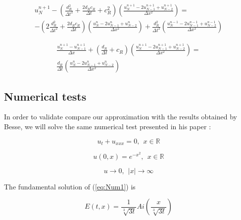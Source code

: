\begin{equation}
	\begin{aligned}
    u_N^{n+1} - \left( \frac{d_R^2}{\Delta t^2} + \frac{2d_Rc_R}{\Delta t} + c_R^2  \right) \left(  \frac{u_{N}^{n+1} - 2u_{N-1}^{n+1} + u_{N-2}^{n+1}}{\Delta x^2} \right) =\\
     -\left( 2\frac{d_R^2}{\Delta t^2} + \frac{2d_Rc_R}{\Delta t}\right) \left(  \frac{u_N^{n} - 2u_{N-1}^n + u_{N-2}^{n}}{\Delta x^2} \right) + \frac{d_R^2}{\Delta t^2} \left(  \frac{u_N^{n-1} - 2u_{N-1}^{n-1} + u_{N-2}^{n-1}}{\Delta x^2} \right)
    \end{aligned}
\end{equation} 
   
\begin{equation}
	\begin{aligned}	
    \frac{u_N^{n+1} - u_{N-1}^{n+1}}{\Delta x} + \left( \frac{d_R}{\Delta t} + c_R \right) \left( \frac{u_N^{n+1} -2 u_{N-1}^{n+1} + u_{N-2}^{n+1}}{\Delta x^2}\right) = \\
      \frac{d_R}{\Delta t}\left( \frac{u_{N}^{n} - 2u_{N-1}^{n} + u_{N-2}^n}{\Delta x^2}\right)
    \end{aligned}
\end{equation}


\subsection{Numerical tests}

\indent In order to validate compare our approximation with the results obtained by Besse, we will solve the same numerical test presented in his paper : 

\begin{equation}
\label{eq:Num1}
 u_t + u_{xxx} = 0, \ \ x \in \mathbb{R}
\end{equation}

\begin{equation}
\label{eq:Num2}
 u(0,x) = e^{-x^2}, \ \ x \in \mathbb{R} 
\end{equation}

\begin{equation}
\label{eq:Num3}
 u \rightarrow 0, \ \ |x| \rightarrow \infty
\end{equation}

\indent The fundamental solution of (\ref{eq:Num1}) is

\begin{equation}
    E(t,x) = \frac{1}{\sqrt[3]{3t}}Ai\left(\frac{x}{\sqrt[3]{3t}} \right)
\end{equation}

